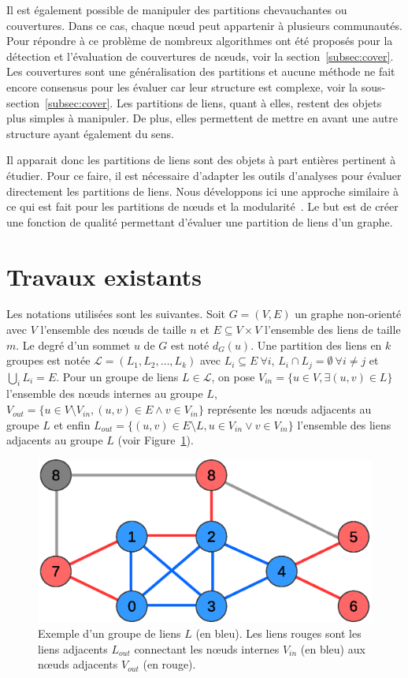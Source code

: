 Il est également possible de manipuler des partitions chevauchantes ou couvertures.
Dans ce cas, chaque n\oe ud peut appartenir à plusieurs communautés.
Pour répondre à ce problème de nombreux algorithmes ont été proposés pour la détection et l'évaluation de couvertures de n\oe uds, voir la section~\ref{subsec:cover}.
Les couvertures sont une généralisation des partitions et aucune méthode ne fait encore consensus pour les évaluer car leur structure est complexe, voir la sous-section~\ref{subsec:cover}.
Les partitions de liens, quant à elles, restent des objets plus simples à manipuler.
De plus, elles permettent de mettre en avant une autre structure ayant également du sens.



Il apparait donc les partitions de liens sont des objets à part entières pertinent à étudier.
Pour ce faire, il est nécessaire d'adapter les outils d'analyses pour évaluer directement les partitions de liens.
Nous développons ici une approche similaire à ce qui est fait pour les partitions de n\oe uds et la modularité~\cite{Newman2004}.
Le but est de créer une fonction de qualité permettant d'évaluer une partition de liens d'un graphe.


\section{Travaux existants}
Les notations utilisées sont les suivantes. Soit $G=(V,E)$ un graphe non-orienté avec $V$ l'ensemble des n\oe uds de taille $n$ et $E \subseteq V \times V$ l'ensemble des liens de taille $m$. 
Le degré d'un sommet $u$ de $G$ est noté $d_G(u)$.
Une partition des liens en $k$ groupes est notée $\mathcal{L}=(L_1,L_2,\ldots,L_k)$ avec $L_i \subseteq E \ \forall i$, $L_i\cap L_j=\emptyset \ \forall i\neq j$ et $\bigcup_i L_i=E$.
Pour un groupe de liens $L \in \mathcal{L}$, on pose $V_{in}=\{u \in V, \exists (u,v) \in L\}$ l'ensemble des n\oe uds internes au groupe $L$, $V_{out}=\{u \in V\setminus V_{in}, (u,v) \in E \wedge v \in V_{in} \}$ représente les n\oe uds adjacents au groupe $L$ et enfin $L_{out}=\{(u,v) \in E \setminus L, u \in V_{in} \vee v \in V_{in} \}$ l'ensemble des liens adjacents au groupe $L$ (voir Figure~\ref{fig:example_def_expected}).

\begin{figure}
\centering
\includegraphics[width=0.4\linewidth]{img/ExpectedNodes/exemple2}
\caption{Exemple d'un groupe de liens $L$ (en \textcolor{semilightblue}{bleu}). Les liens \textcolor{pinkyred}{rouges} sont les liens adjacents $L_{out}$ connectant les n\oe uds internes $V_{in}$ (en \textcolor{semilightblue}{bleu}) aux n\oe uds adjacents $V_{out}$ (en  \textcolor{pinkyred}{rouge}).}
\label{fig:example_def_expected}
\end{figure}

